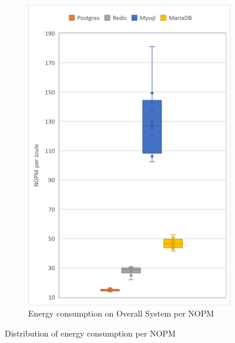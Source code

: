 \begin{figure}[!ht]
\begin{subfigure}[b]{0.32\textwidth}
                \includegraphics[width=1\columnwidth]{results/boxplot/total-nopm.png}
            \caption[]%
            {{\small Energy consumption on Overall System per NOPM}}    
            \label{fig:bocplotnopmtotal}
        \end{subfigure}
        \caption[ Distribution of energy consumption per NOPM ]
        {\small Distribution of energy consumption per NOPM} 
        \label{fig:bocplotnumber}
    \end{figure}
   